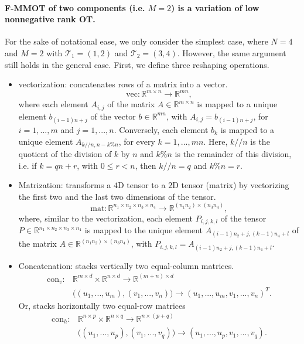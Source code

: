 \documentclass{article}
\begin{document}
\paragraph{F-MMOT of two components (i.e. $M=2$) is a variation of low nonnegative rank OT.} 
For the sake of notational ease, we only consider the simplest case, where $N=4$ and $M=2$ with $\mathcal T_1 = (1,2)$ and 
$\mathcal T_2 = (3,4)$. However, the same argument still holds in the general case. First, we define three reshaping operations.
\begin{itemize}
  \item vectorization: concatenates rows of a matrix into a vector.
  \begin{equation*}
    \text{vec}: \mathbb R^{m \times n} \to \mathbb R^{m n},
  \end{equation*}
  where each element $A_{i,j}$ of the matrix $A \in \mathbb R^{m \times n}$ is mapped to a unique element $b_{(i-1)n + j}$ of the vector 
  $b \in \mathbb R^{m n}$, with $A_{i,j} = b_{(i-1)n + j}$, for $i = 1, ..., m$ and $j = 1, ...,n$. Conversely, 
  each element $b_k$ is mapped to a unique element $A_{k // n, n - k \% n}$, for every $k = 1, ..., mn$. 
  Here, $k // n$ is the quotient of the division of $k$ by $n$ and $k \% n$ is the 
  remainder of this division, i.e. if $k = q n + r$, with $0 \leq r < n$, then $k // n = q$ and $k \% n = r$.
  
  \item Matrization: transforms a $4$D tensor to a $2$D tensor (matrix) by vectorizing the first two and the last 
  two dimensions of the tensor.
  \begin{equation*}
    \text{mat}: \mathbb R^{n_1 \times n_2 \times n_3 \times n_4} \to \mathbb R^{(n_1 n_2) \times (n_3 n_4)},
  \end{equation*}
  where, similar to the vectorization, each element $P_{i,j,k,l}$ of the tensor 
  $P \in \mathbb R^{n_1 \times n_2 \times n_3 \times n_4}$ is mapped to the unique element $A_{(i-1)n_2 + j, (k-1)n_4 + l}$ of the 
  matrix $A \in \mathbb R^{(n_1 n_2) \times (n_3 n_4)}$, with $P_{i,j,k,l} = A_{(i-1)n_2 + j, (k-1)n_4 + l}$.

  \item Concatenation: stacks vertically two equal-column matrices.
  \begin{equation*}
    \begin{split}
      \text{con}_v: &\mathbb R^{m \times d} \times \mathbb R^{n \times d} \to \mathbb R^{(m+n) \times d} \\
      & \big( (u_1, ..., u_m),(v_1, ..., v_n) \big) \to (u_1, ..., u_m, v_1, ..., v_n)^T.
    \end{split}
  \end{equation*}
  Or, stacks horizontally two equal-row matrices
  \begin{equation*}
    \begin{split}
      \text{con}_h: &\mathbb R^{n \times p} \times \mathbb R^{n \times q} \to \mathbb R^{n \times (p+q)} \\
      & \big( (u_1, ..., u_p),(v_1, ..., v_q) \big) \to (u_1, ..., u_p, v_1, ..., v_q).
    \end{split}
  \end{equation*}
\end{itemize}
\end{document}
